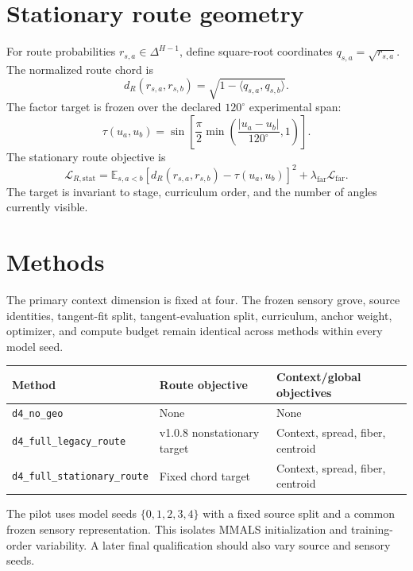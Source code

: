 \documentclass[10pt]{article}
\begin{document}
\section{Stationary route geometry}
For route probabilities $r_{s,a}\in\Delta^{H-1}$, define square-root coordinates $q_{s,a}=\sqrt{r_{s,a}}$. The normalized route chord is
\begin{equation}
 d_R(r_{s,a},r_{s,b})=\sqrt{1-\langle q_{s,a},q_{s,b}\rangle}.
\end{equation}
The factor target is frozen over the declared $120^\circ$ experimental span:
\begin{equation}
 \tau(u_a,u_b)=\sin\left[\frac{\pi}{2}\min\left(\frac{|u_a-u_b|}{120^\circ},1\right)\right].
\end{equation}
The stationary route objective is
\begin{equation}
 \mathcal L_{R,\mathrm{stat}}=
 \mathbb E_{s,a<b}\left[d_R(r_{s,a},r_{s,b})-\tau(u_a,u_b)\right]^2
 +\lambda_{\mathrm{far}}\mathcal L_{\mathrm{far}}.
\end{equation}
The target is invariant to stage, curriculum order, and the number of angles currently visible.

\section{Methods}
The primary context dimension is fixed at four. The frozen sensory grove, source identities, tangent-fit split, tangent-evaluation split, curriculum, anchor weight, optimizer, and compute budget remain identical across methods within every model seed.

\begin{center}
\begin{tabularx}{\linewidth}{@{}lXX@{}}
\toprule
Method & Route objective & Context/global objectives \\
\midrule
\texttt{d4\_no\_geo} & None & None \\
\texttt{d4\_full\_legacy\_route} & v1.0.8 nonstationary target & Context, spread, fiber, centroid \\
\texttt{d4\_full\_stationary\_route} & Fixed chord target & Context, spread, fiber, centroid \\
\bottomrule
\end{tabularx}
\end{center}

The pilot uses model seeds $\{0,1,2,3,4\}$ with a fixed source split and a common frozen sensory representation. This isolates MMALS initialization and training-order variability. A later final qualification should also vary source and sensory seeds.
\end{document}
